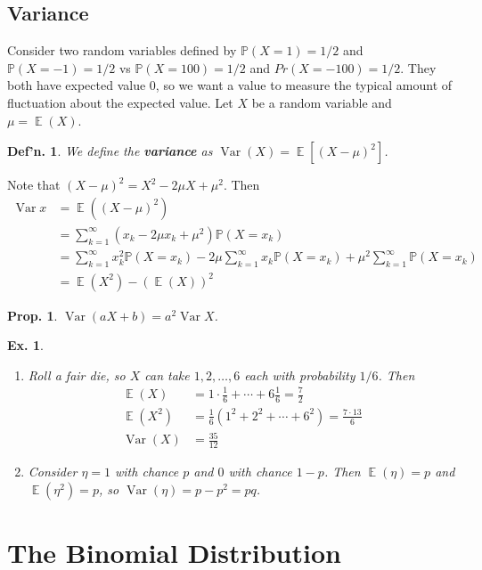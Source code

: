 \documentclass[12pt, a4paper]{book}
\DeclareMathOperator{\E}{\mathbb{E}}
\DeclareMathOperator{\Var}{Var}
\renewcommand{\Pr}{\mathbb{P}}
\newtheorem{definition}[theorem]{Def'n.}
\newtheorem{proposition}[theorem]{Prop.}
\newtheorem{example}[theorem]{Ex.}
\theoremstyle{nonumberplain}
\begin{document}
\subsection{Variance}
Consider two random variables defined by $\Pr(X=1)=1/2$ and $\Pr(X=-1)=1/2$ vs $\Pr(X=100)=1/2$ and $Pr(X=-100)=1/2$.
They both have expected value $0$, so we want a value to measure the typical amount of fluctuation about the expected value.
Let $X$ be a random variable and $\mu=\E(X)$.
\begin{definition}
    We define the \textbf{variance} as $\Var(X)=\E[(X-\mu)^2]$.
\end{definition}
Note that $(X-\mu)^2=X^2-2\mu X+\mu^2$.
Then
\begin{align*}
    \Var x &= \E((X-\mu)^2)\\
           &= \sum\limits_{k=1}^\infty(x_k-2\mu x_k+\mu^2)\Pr(X=x_k)\\
           &= \sum\limits_{k=1}^\infty x_k^2\Pr(X=x_k)-2\mu\sum\limits_{k=1}^\infty x_k\Pr(X=x_k)+\mu^2\sum\limits_{k=1}^\infty\Pr(X=x_k)\\
           &= \E(X^2)-(\E(X))^2
\end{align*}
\begin{proposition}
    $\Var(aX+b)=a^2\Var X$.
\end{proposition}
\begin{example}
    \begin{enumerate}
        \item Roll a fair die, so $X$ can take $1,2,\ldots,6$ each with probability $1/6$.
            Then
            \begin{align*}
                \E(X)&=1\cdot\frac{1}{6}+\cdots+6\frac{1}{6}=\frac{7}{2}\\
                \E(X^2)&= \frac{1}{6}(1^2+2^2+\cdots+6^2)=\frac{7\cdot 13}{6}\\
                \Var(X) &= \frac{35}{12}
            \end{align*}
        \item Consider $\eta=1$ with chance $p$ and $0$ with chance $1-p$.
            Then $\E(\eta)=p$ and $\E(\eta^2)=p$, so $\Var(\eta)=p-p^2=pq$.
    \end{enumerate}
\end{example}
\section{The Binomial Distribution}
\end{document}
